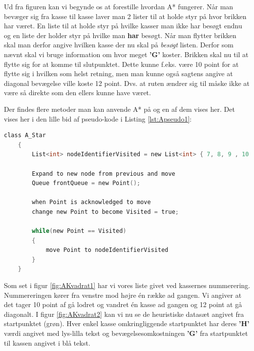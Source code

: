 Ud fra figuren kan vi begynde os at forestille hvordan A* fungerer. Når man bevæger sig fra kasse til kasse laver man 2 lister til at holde styr på hvor brikken har været. En liste til at holde styr på hvilke kasser man ikke har besøgt endnu og en liste der holder styr på hvilke man \textbf{har} besøgt. Når man flytter brikken skal man derfor angive hvilken kasse der nu skal på \textit{besøgt} listen. Derfor som nævnt skal vi bruge information om hvor meget \textbf{'G'} koster. Brikken skal nu til at flytte sig for at komme til slutpunktet. Dette kunne f.eks. være 10 point for at flytte sig i hvilken som helst retning, men man kunne også sagtens angive at diagonal bevægelse ville koste 12 point. Dvs. at ruten ændrer sig til måske ikke at være så direkte som den ellers kunne have været.

Der findes flere metoder man kan anvende A* på og en af dem vises her.
Det vises her i den lille bid af pseudo-kode i Listing \ref{lst:Apseudo1}:
\begin{lstlisting}[caption={A stjerne og pseudo-kode af brug af lister},label={lst:Apseudo1},language=C]
	class A_Star
	{
		List<int> nodeIdentifierVisited = new List<int> { 7, 8, 9 , 10, 11, 12, 13, 14, 21, 23, 24, 28, 29, 30, 31, 32};

		Expand to new node from previous and move
		Queue frontQueue = new Point();

		when Point is acknowledged to move
		change new Point to become Visited = true;

		while(new Point == Visited)
		{
			move Point to nodeIdentifierVisited
		}
	}
\end{lstlisting}

Som set i figur \ref{fig:AKvadrat1} har vi vores liste givet ved kassernes nummerering. Nummereringen kører fra venstre mod højre én række ad gangen. Vi angiver at det tager 10 point af gå lodret og vandret én kasse ad gangen og 12 point at gå diagonalt. I figur \ref{fig:AKvadrat2} kan vi nu se de heuristiske datasæt angivet fra startpunktet (grøn). Hver enkel kasse omkringliggende startpunktet har deres \textbf{'H'} værdi angivet med lys-lilla tekst og bevægelsesomkostningen \textbf{'G'} fra startpunktet til kassen angivet i blå tekst.

